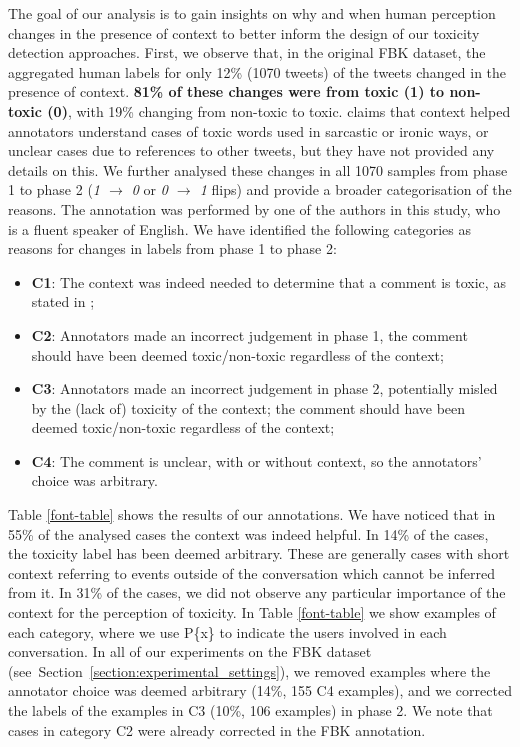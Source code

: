 \documentclass[acmsmall]{acmart}
\begin{document}
The goal of our analysis is to gain insights on why and when human perception changes in the presence of context to better inform  the design of our toxicity detection approaches. First, we observe that, in the original FBK dataset, the aggregated human labels for only 12\% (1070 tweets) of the tweets changed in the presence of context. {\bf 81\% of these changes were from toxic (1) to non-toxic (0)}, with 19\% changing from non-toxic to toxic. \cite{FBK} claims that context helped annotators understand cases of toxic words used in sarcastic or ironic ways, or unclear cases due to references to other tweets, but they have not provided any details on this. We further analysed these changes in all 1070 samples from phase 1 to phase 2 (\textit{1 $\rightarrow$ 0} or \textit{0 $\rightarrow$ 1} flips) and provide a broader categorisation of the reasons. The annotation was performed by one of the authors in this study, who is a fluent speaker of English. We have identified the following categories as reasons for changes in labels from phase 1 to phase 2:
\begin{itemize}
    \item {\bf C1}: The context was indeed needed to determine that a comment is toxic, as stated in \cite{FBK};
    \item  {\bf C2}: Annotators made an incorrect judgement in phase 1, the comment should have been deemed toxic/non-toxic regardless of the context;
    \item {\bf C3}: Annotators made an incorrect judgement in phase 2, potentially misled by the (lack of) toxicity of the context; the comment should have been deemed toxic/non-toxic regardless of the context; 
    \item {\bf C4}: The comment is unclear, with or without context, so the annotators' choice was arbitrary. 
\end{itemize}

Table \ref{font-table} shows the results of our annotations. We have noticed that in 55\% of the analysed cases the context was indeed helpful. In 14\% of the cases, the toxicity label has been deemed arbitrary. These are generally cases with short context referring to events outside of the conversation which cannot be inferred from it. In 31\% of the cases, we did not observe any particular importance of the context for the perception of toxicity. In Table \ref{font-table} we show examples of each category, where we use P\{x\} to indicate the users involved in each conversation. In all of our experiments on the FBK dataset (see~Section~\ref{section:experimental_settings}), we removed examples where the annotator choice was deemed arbitrary (14\%, 155 C4 examples), and we corrected the labels of the examples in C3 (10\%, 106 examples) in phase 2. We note that cases in category C2 were already corrected in the FBK annotation.  
\end{document}
